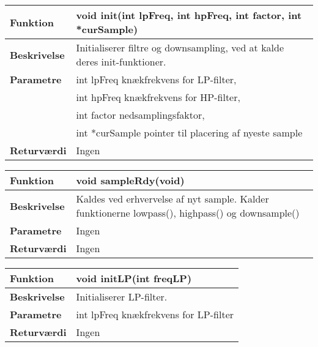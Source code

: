 \begin{center}
    \begin{tabular}{ | l | p{10cm} |}
    \hline
    \textbf{Funktion}	 	& void init(int lpFreq, int hpFreq, int factor, int *curSample)									\\ \hline
    \textbf{Beskrivelse} 	& Initialiserer filtre og downsampling, ved at kalde deres init-funktioner.						\\ \hline
    \textbf{Parametre}		& int lpFreq knækfrekvens for LP-filter,\\&
    						  int hpFreq knækfrekvens for HP-filter,\\&
    						  int factor nedsamplingsfaktor, \\&
    						  int *curSample pointer til placering af nyeste sample
    																						 \\ \hline
    \textbf{Returværdi} 	& Ingen														     \\ \hline
    \end{tabular}
\end{center}

\begin{center}
    \begin{tabular}{ | l | p{10cm} |}
    \hline
    \textbf{Funktion}	 	& void sampleRdy(void)									\\ \hline
    \textbf{Beskrivelse} 	& Kaldes ved erhvervelse af nyt sample. Kalder funktionerne lowpass(), highpass() og downsample()						\\ \hline
    \textbf{Parametre}		& Ingen
    																						 \\ \hline
    \textbf{Returværdi} 	& Ingen														     \\ \hline
    \end{tabular}
\end{center}

\begin{center}
    \begin{tabular}{ | l | p{10cm} |}
    \hline
    \textbf{Funktion}	 	& void initLP(int freqLP)									\\ \hline
    \textbf{Beskrivelse} 	& Initialiserer LP-filter.						\\ \hline
    \textbf{Parametre}		& int lpFreq knækfrekvens for LP-filter												 																									\\ \hline
    \textbf{Returværdi} 	& Ingen														     \\ \hline
    \end{tabular}
\end{center}

